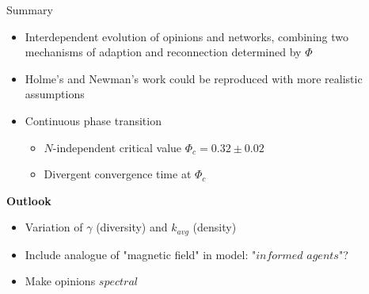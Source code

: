 \documentclass[xcolor=x11names,compress]{beamer}
\renewcommand{\(}{\begin{columns}}
\renewcommand{\)}{\end{columns}}
\newcommand{\<}[1]{\begin{column}{#1}}
\renewcommand{\>}{\end{column}}
\begin{document}
\begin{frame}{Summary}

\begin{itemize}
\item Interdependent evolution of opinions and networks, combining two mechanisms of adaption and reconnection determined by $\Phi$
\item Holme's and Newman's work could be reproduced with more realistic assumptions %
\item Continuous phase transition
\begin{itemize}
\item $N$-independent critical value $\Phi_c = 0.32 \pm 0.02$
\item Divergent convergence time at $\Phi_c$
\end{itemize}
\end{itemize}

\textbf{Outlook}
\begin{itemize}
\item Variation of $\gamma$ (diversity) and $k_{avg}$ (density)
\item Include analogue of "magnetic field" in model: "$informed$ $ agents$"?
\item Make opinions $spectral$
\end{itemize}

\end{frame}

\end{document}
